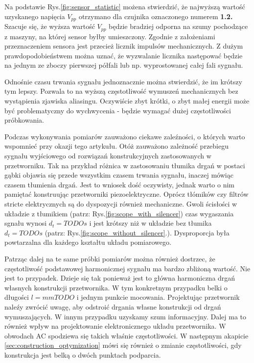 Na podstawie Rys.\ref{fig:sensor_statistic} możena stwierdzić, że najwyższą wartość
 uzyskanego napięcia $V_{pp}$ otrzymano dla czujnika oznaczonego numerem \textbf{1.2.} 
 Szacuje się, że wyższa wartość $V_{pp}$ będzie bradziej odporna na szumy pochodzące 
 z maszyny, na której sensor byłby umieszczony. Zgodnie z założeniami przeznaczeniem 
 sensora jest przecież licznik impulsów mechanicznych. Z dużym prawdopodobieństwem 
 można uznać, że wyzwalanie licznika następować będzie na jednym ze zboczy pierwszej 
 półfali lub np. wyprostowanej całej fali sygnału. 
 
\indent Odnośnie czasu trwania sygnału jednoznacznie można stwierdzić, że im krótszy tym 
lepszy. Pozwala to na wyższą częstotliwość wymuszeń mechanicznych bez wystąpienia zjawiska 
aliasingu. Oczywiście zbyt krótki, o zbyt małej energii może być problematyczny do 
wychwycenia - będzie wymagać dużej częstotliwości próbkowania.

\indent Podczas wykonywania pomiarów zauważono ciekawe zaleźności, o których warto wspomnieć
 przy okazji tego artykułu. Otóż zauważono zależność przebiegu sygnału wyjściowego od 
 rozwiązań konstrukcyjnych zastosowanych w przetworniku. Tak na przykład różnica w 
 zastosowaniu tłumika drgań w postaci gąbki objawia się przede wszystkim czasem trwania 
 sygnału, inaczej mówiąc czasem tłumienia drgań. Jest to wniosek dość oczywisty, jednak 
 warto o nim pamiętać konstruując przetworniki piezoelektryczne. Oprócz tłómików czy 
 filtrów stricte elektrycznych są do dyspozycji również mechaniczne. Gwoli ścisłości w 
 układzie z tłumikiem (patrz: Rys.\ref{fig:scope_with_silencer}) czas wygaszania sgnału 
 wynosi $d_t = TODOs$ i jest krótszy niż w układzie bez tłumika 
 $d_t = TODOs$ (patrz: Rys.\ref{fig:scope_without_silencer}.). 
 Dysproporcja była powtarzalna dla każdego kształtu układu pomiarowego.

\indent Patrząc dalej na te same próbki pomiarów można również dostrzec, że częstotliwość 
podstawowej harmonicznej sygnału ma bardzo zbliżoną wartość. Nie jest to przypadek. 
Dzieje się tak ponieważ jest to główna harmoniczna drgań własnych konstrukcji przetwornika. 
W tym konkretnym przypadku belki o długości $l = mmTODO$ i jednym punkcie mocowania. 
Projektując przetwornik naleźy zwrócić uwagę, aby odstroić drgania własne konstrukcji 
od drgań wymuszających. W innym przypadku uzyskamy szum informacyjny. Dalej ma to również 
wpływ na projektowanie elektronicznego układu przetwornika. W obwodach AC spodziewa się 
takich właśnie częstotliwości. W następnym akapicie \ref{sec:construction_optymization} 
mówi się również o zmianie częstotliwości, gdy konstrukcja jest belką o dwóch punktach 
podparcia. 


